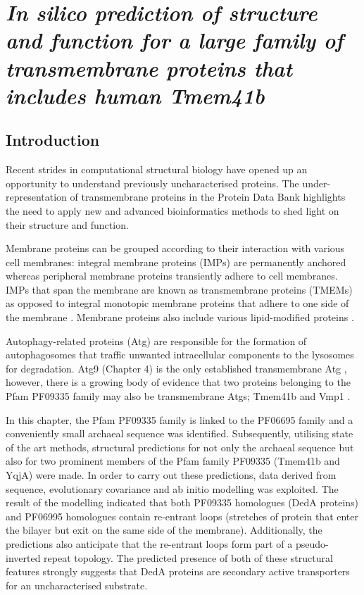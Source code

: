 \chapter{\emph{In silico prediction of structure and function for a large family of transmembrane proteins that includes human Tmem41b}}

\section{Introduction}
Recent strides in computational structural biology have opened up an opportunity to understand previously uncharacterised proteins.  The under-representation of transmembrane proteins in the Protein Data Bank highlights the need to apply new and advanced bioinformatics methods to shed light on their structure and function. 

Membrane proteins can be grouped according to their interaction with various cell membranes: integral membrane proteins (IMPs) are permanently anchored whereas peripheral membrane proteins transiently adhere to cell membranes. IMPs that span the membrane are known as transmembrane proteins (TMEMs) as opposed to integral monotopic membrane proteins that adhere to one side of the membrane \cite{Fowler2006}. Membrane proteins also include various lipid-modified proteins \cite{Resh2016}.

Autophagy-related proteins (Atg) are responsible for the formation of autophagosomes that traffic unwanted intracellular components to the lysosomes for degradation.  Atg9 (Chapter 4) is the only established transmembrane Atg \cite{guardia2020structure}, however, there is a growing body of evidence that two proteins belonging to the Pfam PF09335 family may also be transmembrane Atgs; Tmem41b and Vmp1 \cite{Morita2019}. 

In this chapter, the Pfam PF09335 family is linked to the PF06695 family and a conveniently small archaeal sequence was identified. Subsequently, utilising state of the art methods, structural predictions for not only the archaeal sequence but also for two prominent members of the Pfam family PF09335 (Tmem41b and YqjA) were made. In order to carry out these predictions, data derived from sequence, evolutionary covariance and ab initio modelling was exploited. The result of the modelling indicated that both PF09335 homologues (DedA proteins) and PF06995 homologues contain re-entrant loops (stretches of protein that enter the bilayer but exit on the same side of the membrane).  Additionally, the predictions also anticipate that the re-entrant loops form part of a pseudo-inverted repeat topology. The predicted presence of both of these structural features strongly suggests that DedA proteins are secondary active transporters for an uncharacterised substrate.


